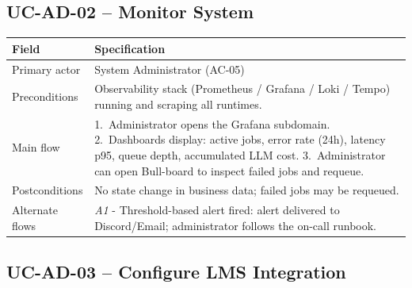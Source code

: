 \subsection{UC-AD-02 -- Monitor System}

\begin{longtable}{|p{3.2cm}|p{10.3cm}|}
\hline
\textbf{Field} & \textbf{Specification} \\
\hline
\endhead
Primary actor & System Administrator (AC-05) \\
\hline
Preconditions & Observability stack (Prometheus / Grafana / Loki /
    Tempo) running and scraping all runtimes. \\
\hline
Main flow &
    1.\ Administrator opens the Grafana subdomain.
    2.\ Dashboards display: active jobs, error rate (24h), latency
    p95, queue depth, accumulated LLM cost.
    3.\ Administrator can open Bull-board to inspect failed jobs and
    requeue. \\
\hline
Postconditions & No state change in business data; failed jobs may
    be requeued. \\
\hline
Alternate flows &
    \emph{A1} - Threshold-based alert fired: alert delivered to
    Discord/Email; administrator follows the on-call runbook. \\
\hline
\end{longtable}

\subsection{UC-AD-03 -- Configure LMS Integration}

